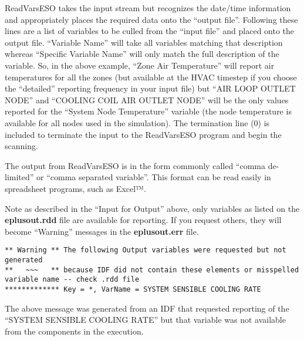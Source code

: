 ReadVarsESO takes the input stream but recognizes the date/time information and appropriately places the required data onto the ``output file''. Following these lines are a list of variables to be culled from the ``input file'' and placed onto the output file. ``Variable Name'' will take all variables matching that description whereas ``Specific Variable Name'' will only match the full description of the variable. So, in the above example, ``Zone Air Temperature'' will report air temperatures for all the zones (but available at the HVAC timestep if you choose the ``detailed'' reporting frequency in your input file) but ``AIR LOOP OUTLET NODE'' and ``COOLING COIL AIR OUTLET NODE'' will be the only values reported for the ``System Node Temperature'' variable (the node temperature is available for all nodes used in the simulation). The termination line (0) is included to terminate the input to the ReadVarsESO program and begin the scanning.

The output from ReadVarsESO is in the form commonly called ``comma de-limited'' or ``comma separated variable''. This format can be read easily in spreadsheet programs, such as Excel™.

Note as described in the ``Input for Output'' above, only variables as listed on the \textbf{eplusout.rdd} file are available for reporting. If you request others, they will become ``Warning'' messages in the \textbf{eplusout.err} file.

\begin{lstlisting}
** Warning ** The following Output variables were requested but not generated
**   ~~~   ** because IDF did not contain these elements or misspelled variable name -- check .rdd file
************* Key = *, VarName = SYSTEM SENSIBLE COOLING RATE
\end{lstlisting}

The above message was generated from an IDF that requested reporting of the ``SYSTEM SENSIBLE COOLING RATE'' but that variable was not available from the components in the execution.

